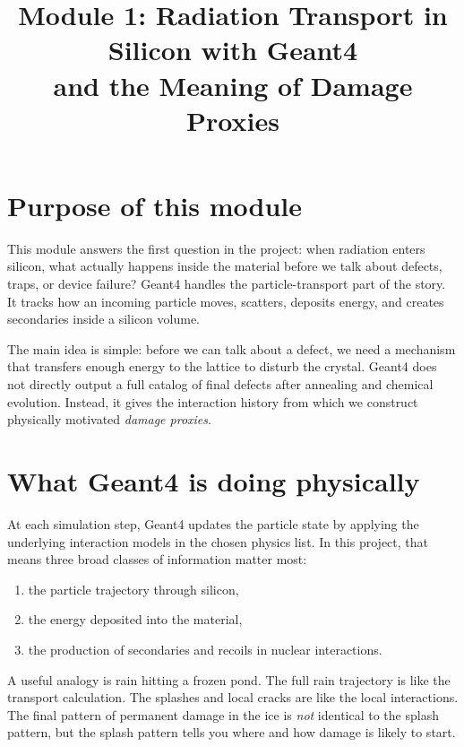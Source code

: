 \documentclass[11pt]{article}
\begin{document}
\title{Module 1: Radiation Transport in Silicon with Geant4 \\ and the Meaning of Damage Proxies}
\author{}
\date{}
\maketitle

\section{Purpose of this module}
This module answers the first question in the project: when radiation enters silicon, what actually happens inside the material before we talk about defects, traps, or device failure? Geant4 handles the particle-transport part of the story. It tracks how an incoming particle moves, scatters, deposits energy, and creates secondaries inside a silicon volume.

The main idea is simple: before we can talk about a defect, we need a mechanism that transfers enough energy to the lattice to disturb the crystal. Geant4 does not directly output a full catalog of final defects after annealing and chemical evolution. Instead, it gives the interaction history from which we construct physically motivated \emph{damage proxies}.

\section{What Geant4 is doing physically}
At each simulation step, Geant4 updates the particle state by applying the underlying interaction models in the chosen physics list. In this project, that means three broad classes of information matter most:
\begin{enumerate}[label=\arabic*.]
    \item the particle trajectory through silicon,
    \item the energy deposited into the material,
    \item the production of secondaries and recoils in nuclear interactions.
\end{enumerate}

A useful analogy is rain hitting a frozen pond. The full rain trajectory is like the transport calculation. The splashes and local cracks are like the local interactions. The final pattern of permanent damage in the ice is \emph{not} identical to the splash pattern, but the splash pattern tells you where and how damage is likely to start.
\end{document}
